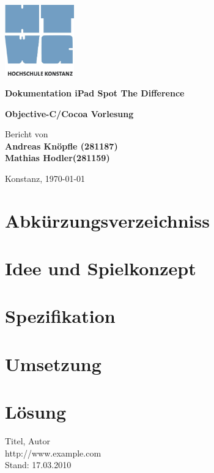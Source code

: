 \documentclass[12pt,oneside,a4paper,bibliography=totoc, listof=totoc,]{scrartcl}
\begin{document}
\thispagestyle{empty}

\begin{center}
	\vskip 1.5cm
	\begin{center}
		\includegraphics[width=30mm]{bilder/htwg-logo}
	\end{center}	
	\vskip 0.8cm

	\LARGE \textbf{Dokumentation iPad Spot The Difference}

	\vskip 0.1cm
	\LARGE \textbf{Objective-C/Cocoa Vorlesung} 
	\vskip 1cm	
	
	\large{  
  	\vskip 1cm
   	
	Bericht von\\
	\textbf{Andreas Knöpfle (281187)\\ Mathias Hodler(281159)}

	\vskip 1.0cm
	
	Konstanz, \today}
	
	
\end{center}

\clearpage

\tableofcontents
\newpage
	
	\section{Abkürzungsverzeichniss} 
		\begin{acronym}
		\end{acronym}
	\newpage		
	
		
	\section{Idee und Spielkonzept}
		
		\newpage
	\section{Spezifikation}
			
		\newpage
	\section{Umsetzung}
			
		\newpage	
	\section{Lösung}
			
		\newpage	

	
 
	\begin{thebibliography}{99}
			Titel, Autor\\
			http://www.example.com\\
			Stand: 17.03.2010	
			
			
					
	\end{thebibliography} 
		
	
\end{document}
